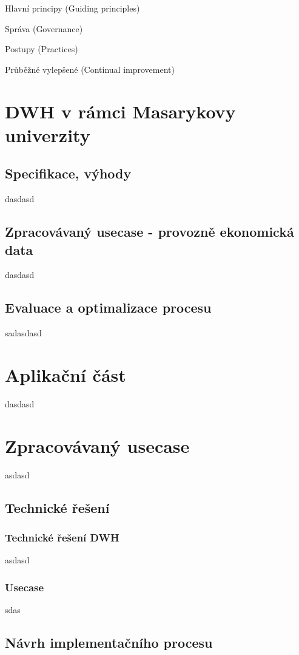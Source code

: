 \documentclass[
  digital,     %
  twoside,     %
  lof,         %
  lot,         %
]{fithesis4}
\begin{document}
\begin{compactitem}
    \item Hlavní principy (Guiding principles)
    \item Správa (Governance)
    \item Postupy (Practices)
    \item Průběžné vylepšené (Continual improvement)
\end{compactitem}

\chapter{DWH v rámci Masarykovy univerzity}
\section{Specifikace, výhody}
dasdasd

\section{Zpracovávaný usecase - provozně ekonomická data}
dasdasd

\section{Evaluace a optimalizace procesu}
sadasdasd

\chapter{Aplikační část}
dasdasd

\chapter{Zpracovávaný usecase}
asdasd

\section{Technické řešení}
\subsection{Technické řešení DWH}
asdasd
\subsection{Usecase}
sdas

\section{Návrh implementačního procesu}
\end{document}

